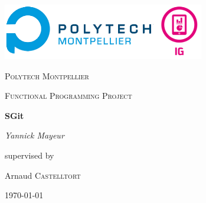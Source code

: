 \begin{titlepage}
	\centering
	\includegraphics[width=0.66\textwidth]{img/title_logo.png}\par\vspace{1cm}
	{\scshape\LARGE Polytech Montpellier\par}
	\vspace{1cm}
	{\scshape\Large Functional Programming Project\par}
	\vspace{1.5cm}
	{\huge\bfseries SGit\par}
	\vspace{2cm}
	{\Large\itshape Yannick Mayeur\par}
	\vfill
	supervised by\par
	Arnaud \textsc{Castelltort}\par

	\vfill

	{\large \today\par}
\end{titlepage}
